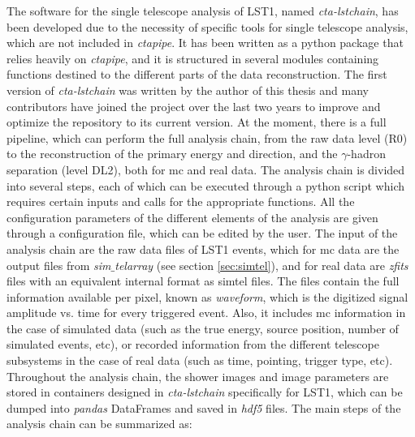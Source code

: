 \documentclass[main.tex]{subfiles}
\begin{document}
The software for the single telescope analysis of LST1, named \textit{cta-lstchain}, has been developed due to the necessity of specific tools for single telescope analysis, which are not included in \textit{ctapipe}. It has been written as a python package that relies heavily on \textit{ctapipe}, and it is structured in several modules containing functions destined to the different parts of the data reconstruction. The first version of \textit{cta-lstchain} was written by the author of this thesis and many contributors have joined the project over the last two years to improve and optimize the repository to its current version. At the moment, there is a full pipeline, which can perform the full analysis chain, from the raw data level (R0) to the reconstruction of the primary energy and direction, and the $\gamma$-hadron separation (level DL2), both for \gls{mc} and real data. The analysis chain is divided into several steps, each of which can be executed through a python script which requires certain inputs and calls for the appropriate functions. All the configuration parameters of the different elements of the analysis are given through a configuration file, which can be edited by the user. The input of the analysis chain are the raw data files of LST1 events, which for \gls{mc} data are the output files from \textit{sim$\_$telarray} (see section \ref{sec:simtel}), and for real data are \textit{zfits} \cite{Pence:2012gd} files with an equivalent internal format as simtel files. The files contain the full information available per pixel, known as \textit{waveform}, which is the digitized signal amplitude vs. time for every triggered event. Also, it includes \gls{mc} information in the case of simulated data (such as the true energy, source position, number of simulated events, etc), or recorded information from the different telescope subsystems in the case of real data (such as time, pointing, trigger type, etc). Throughout the analysis chain, the shower images and image parameters are stored in containers designed in \textit{cta-lstchain} specifically for LST1, which can be dumped into \textit{pandas} DataFrames and saved in \textit{hdf5} \cite{hdf5} files.
The main steps of the analysis chain can be summarized as:\\
\end{document}
